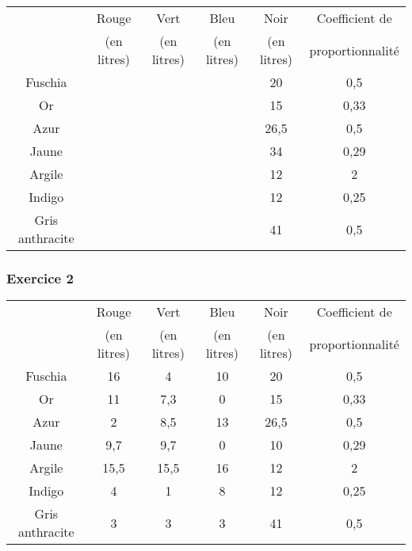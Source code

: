\documentclass[a4paper,10pt]{beamer}
\begin{document}
{\begin{frame}
	\hspace*{-0.5cm}\begin{tabular}{|c|c|c|c|c|c|}
		\hline
		                & Rouge       & Vert        & Bleu        & Noir        & Coefficient de   \\
		                & (en litres) & (en litres) & (en litres) & (en litres) & proportionnalité \\ \hline
		Fuschia         &             &             &             & 20          & 0,5              \\ \hline
		Or              &             &             &             & 15          & 0,33             \\ \hline
		Azur            &             &             &             & 26,5        & 0,5              \\ \hline
		Jaune           &             &             &             & 34          & 0,29             \\ \hline
		Argile          &             &             &             & 12          & 2                \\ \hline
		Indigo          &             &             &             & 12          & 0,25             \\ \hline
		Gris anthracite &             &             &             & 41          & 0,5              \\ \hline
	\end{tabular}
\end{frame}

\begin{frame}
	\frametitle{Exercice 2}

	\hspace*{-0.5cm}\begin{tabular}{|c|c|c|c|c|c|}
		\hline
		                & Rouge       & Vert        & Bleu        & Noir        & Coefficient de   \\
		                & (en litres) & (en litres) & (en litres) & (en litres) & proportionnalité \\ \hline
		Fuschia         & 16          & 4           & 10          & 20          & 0,5              \\ \hline
		Or              & 11          & 7,3         & 0           & 15          & 0,33             \\ \hline
		Azur            & 2           & 8,5         & 13          & 26,5        & 0,5              \\ \hline
		Jaune           & 9,7         & 9,7         & 0           & 10          & 0,29             \\ \hline
		Argile          & 15,5        & 15,5        & 16          & 12          & 2                \\ \hline
		Indigo          & 4           & 1           & 8           & 12          & 0,25             \\ \hline
		Gris anthracite & 3           & 3           & 3           & 41          & 0,5              \\ \hline
	\end{tabular}
\end{frame}
}

\renewcommand{\arraystretch}{1}
\end{document}
